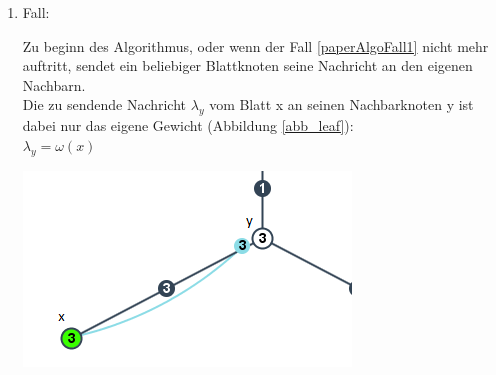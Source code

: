 \begin{enumerate}
\begin{enumerate}
		\end{enumerate}
		
	\item Fall:
		
		\begin{minipage}{0.55\textwidth} 
			Zu beginn des Algorithmus, oder wenn der Fall \ref{paperAlgoFall1} nicht mehr auftritt, sendet ein beliebiger Blattknoten seine Nachricht an den eigenen Nachbarn.\\
			
			Die zu sendende Nachricht $\lambda_{y}$ vom Blatt x an seinen Nachbarknoten y ist dabei nur das eigene Gewicht (Abbildung \ref{abb_leaf}):\\
			$\lambda_{y} = \omega(x)$
		\end{minipage}
		\hfill
		\begin{minipage}{0.35\textwidth}
						
			\includegraphics[width=\textwidth]{bilder/abb_blattknoten.png}
			\label{abb_leaf}
		\end{minipage}
		
\end{enumerate}



